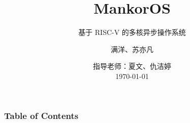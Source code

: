 \documentclass[aspectratio=169]{beamer}
\title{MankorOS}
\subtitle{基于 RISC-V 的多核异步操作系统}
\author{满洋、苏亦凡}
\institute[HITSZ]{哈尔滨工业大学（深圳）}
\date[\today]{ 指导老师：夏文、仇洁婷\\ \vspace{1em} \today}
\begin{document}
\frame{\titlepage}




\begin{frame}
    \frametitle{Table of Contents}
    \tableofcontents
\end{frame}







\end{document}

